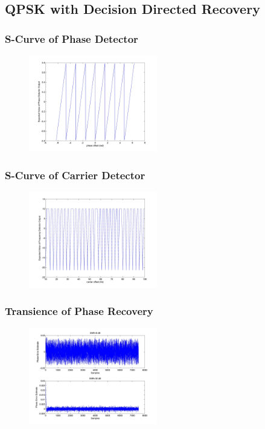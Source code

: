 \documentclass[]{article}
\begin{document}
\subsection{QPSK with Decision Directed Recovery}

\subsubsection{S-Curve of Phase Detector}
\begin{figure}[H]
\centering
\hspace*{-2cm}\includegraphics[width=0.5\textwidth]{qpScurvepo_ddr.jpg}
\caption{}
\end{figure}
\subsubsection{S-Curve of Carrier Detector}
\begin{figure}[H]
\centering
\hspace*{-2cm}\includegraphics[width=0.5\textwidth]{qpScurvefo.jpg}
\caption{}
\end{figure}
\subsubsection{Transience of Phase Recovery}
\begin{figure}[H]
\centering
\hspace*{-2cm}\includegraphics[width=0.5\textwidth]{qpLoopFilterpo_ddr1.jpg}
\caption{}
\end{figure}
\end{document}
